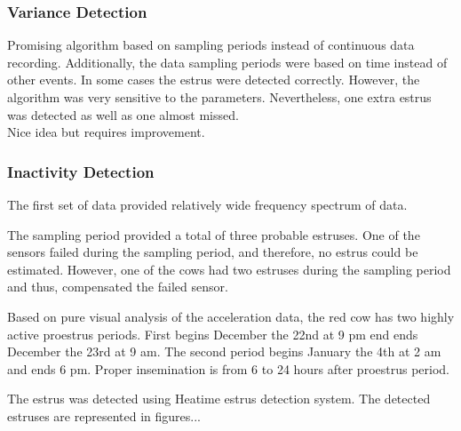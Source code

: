 \documentclass[english,12pt,a4paper,pdftex,elec,utf8]{aaltothesis}
\begin{document}
\subsubsection{Variance Detection} \label{variancedetectionevaluation}

Promising algorithm based on sampling periods instead of continuous data recording. Additionally, the data sampling periods were based on time instead of other events. In some cases the estrus were detected correctly. However, the algorithm was very sensitive to the parameters. Nevertheless, one extra estrus was detected as well as one almost missed. \\

Nice idea but requires improvement.

\subsubsection{Inactivity Detection} \label{inactivitydetectionevaluation}



The first set of data provided relatively wide frequency spectrum of data.



The sampling period provided a total of three probable estruses. One of the sensors failed during the sampling period, and therefore, no estrus could be estimated. However, one of the cows had two estruses during the sampling period and thus, compensated the failed sensor.

Based on pure visual analysis of the acceleration data, the red cow has two highly active proestrus periods. First begins December the 22nd at 9 pm end ends December the 23rd at 9 am. The second period begins January the 4th at 2 am and ends 6 pm. Proper insemination is from 6 to 24 hours after proestrus period.

The estrus was detected using Heatime estrus detection system. The detected estruses are represented in figures...

%
\end{document}
